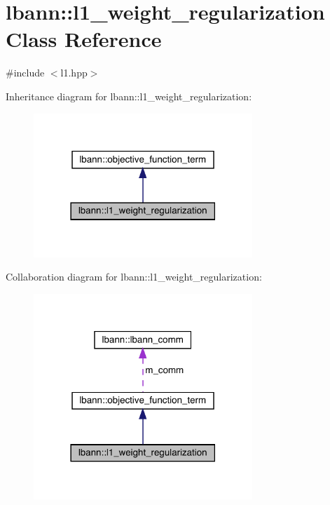 \hypertarget{classlbann_1_1l1__weight__regularization}{}\section{lbann\+:\+:l1\+\_\+weight\+\_\+regularization Class Reference}
\label{classlbann_1_1l1__weight__regularization}


{\ttfamily \#include $<$l1.\+hpp$>$}



Inheritance diagram for lbann\+:\+:l1\+\_\+weight\+\_\+regularization\+:\nopagebreak
\begin{figure}[H]
\begin{center}
\leavevmode
\includegraphics[width=234pt]{classlbann_1_1l1__weight__regularization__inherit__graph}
\end{center}
\end{figure}


Collaboration diagram for lbann\+:\+:l1\+\_\+weight\+\_\+regularization\+:\nopagebreak
\begin{figure}[H]
\begin{center}
\leavevmode
\includegraphics[width=234pt]{classlbann_1_1l1__weight__regularization__coll__graph}
\end{center}
\end{figure}
